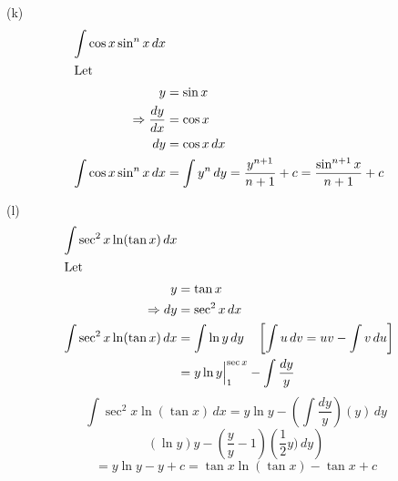 \documentclass{article}
\begin{document}
(k)
\[
\begin{aligned}
    \int \cos x \sin^n x \, dx \\
    \intertext{Let}
    y &= \sin x \\
    \Rightarrow \frac{dy}{dx} &= \cos x \\
    dy &= \cos x \, dx \\
    \int \cos x \sin^n x \, dx &= \int y^n \, dy = \frac{y^{n+1}}{n+1} + c = \frac{\sin^{n+1} x}{n+1} + c
\end{aligned}
\]

(l)
\[
\begin{aligned}
    \int \sec^2 x \ln (\tan x) \, dx \\
    \intertext{Let}
    y &= \tan x \\
    \Rightarrow dy &= \sec^2 x \, dx \\
    \int \sec^2 x \ln (\tan x) \, dx &= \int \ln y \, dy \quad \left[ \int u \, dv = uv - \int v \, du \right] \\
    &= y \ln y \Big|_{1}^{\sec x} - \int \frac{dy}{y}
\end{aligned}
\]
\[\int \sec^2 x \ln (\tan x) \, dx = y \ln y - \left( \int \frac{dy}{y} \right) (y) \, dy\]
\[
(\ln y)y - \left( \frac{y}{y} - 1 \right) \left( \frac{1}{2} y) \, dy \right)
\]
\[
= y \ln y - y + c = \tan x \ln (\tan x) - \tan x + c
\]
\end{document}
